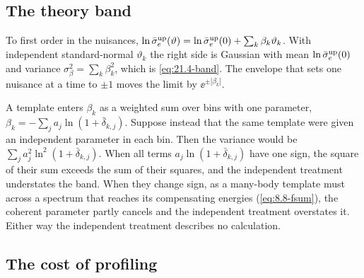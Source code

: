 \subsection{The theory band}

To first order in the nuisances, $\ln\bar{\sigma}_{e}^{\mathrm{up}}(\vartheta) = \ln\bar{\sigma}_{e}^{\mathrm{up}}(0) + \sum_k\beta_k\vartheta_k$. With independent standard-normal $\vartheta_k$ the right side is Gaussian with mean $\ln\bar{\sigma}_{e}^{\mathrm{up}}(0)$ and variance $\sigma_\beta^2 = \sum_k\beta_k^2$, which is \cref{eq:21.4-band}. The envelope that sets one nuisance at a time to $\pm1$ moves the limit by $\ee^{\pm|\beta_k|}$.

A template enters $\beta_k$ as a weighted sum over bins with one parameter, $\beta_k = -\sum_ja_j\ln(1 + \bar\delta_{k,j})$. Suppose instead that the same template were given an independent parameter in each bin. Then the variance would be $\sum_ja_j^2\ln^2(1 + \bar\delta_{k,j})$. When all terms $a_j\ln(1 + \bar\delta_{k,j})$ have one sign, the square of their sum exceeds the sum of their squares, and the independent treatment understates the band. When they change sign, as a many-body template must across a spectrum that reaches its compensating energies (\cref{eq:8.8-fsum}), the coherent parameter partly cancels and the independent treatment overstates it. Either way the independent treatment describes no calculation.

\subsection{The cost of profiling}

